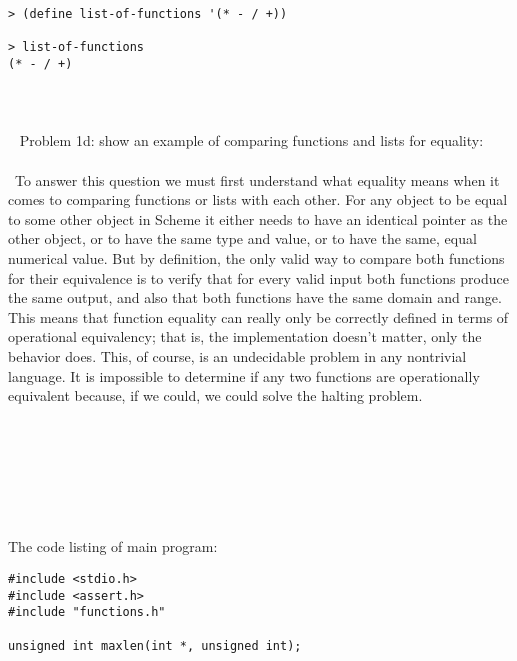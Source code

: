 \documentclass{article}
\begin{document}
\begin{verbatim} 
> (define list-of-functions '(* - / +))

> list-of-functions
(* - / +)
\end{verbatim}
\paragraph{}\
\paragraph{}\
\rmfamily
Problem 1d: show an example of comparing functions and lists for equality:
\paragraph{}\
To answer this question we must first understand what equality means when it comes to comparing functions or lists with each other. For any object to be equal to some other object in Scheme it either needs to have an identical pointer as the other object, or to have the same type and value, or to have the same, equal numerical value. But by definition, the only valid way to compare both functions for their equivalence is to verify that for every valid input both functions produce the same output, and also that both functions have the same domain and range. This means that function equality can really only be correctly defined in terms of operational equivalency; that is, the implementation doesn't matter, only the behavior does. This, of course, is an undecidable problem in any nontrivial language. It is impossible to determine if any two functions are operationally equivalent because, if we could, we could solve the halting problem.


\paragraph{}\
\paragraph{}\
\paragraph{}\

		\rmfamily
		\noindent The code listing of main program:
		\begin{verbatim}
#include <stdio.h>
#include <assert.h>
#include "functions.h"

unsigned int maxlen(int *, unsigned int);
		\end{verbatim}
\end{document}
